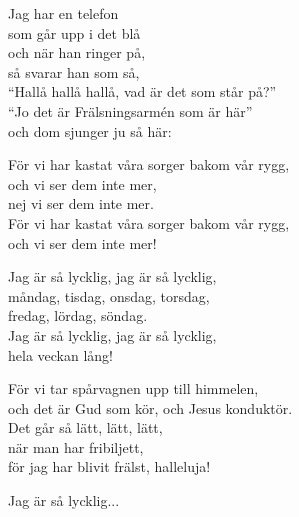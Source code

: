 \vspace{10pt}
Jag har en telefon\\
som går upp i det blå\\
och när han ringer på,\\
så svarar han som så,\\
``Hallå hallå hallå, vad är det som står på?''\\
``Jo det är Frälsningsarmén som är här''\\
och dom sjunger ju så här:\par
\vspace{10pt}
För vi har kastat våra sorger bakom vår rygg,\\
och vi ser dem inte mer,\\
nej vi ser dem inte mer.\\
För vi har kastat våra sorger bakom vår rygg,\\
och vi ser dem inte mer!\par
\vspace{10pt}
Jag är så lycklig, jag är så lycklig,\\
måndag, tisdag, onsdag, torsdag,\\
fredag, lördag, söndag.\\
Jag är så lycklig, jag är så lycklig,\\
hela veckan lång!\par
\vspace{10pt}
För vi tar spårvagnen upp till himmelen,\\
och det är Gud som kör, och Jesus konduktör.\\
Det går så lätt, lätt, lätt,\\
när man har fribiljett,\\
för jag har blivit frälst, halleluja!\par
\vspace{10pt}
Jag är så lycklig...

